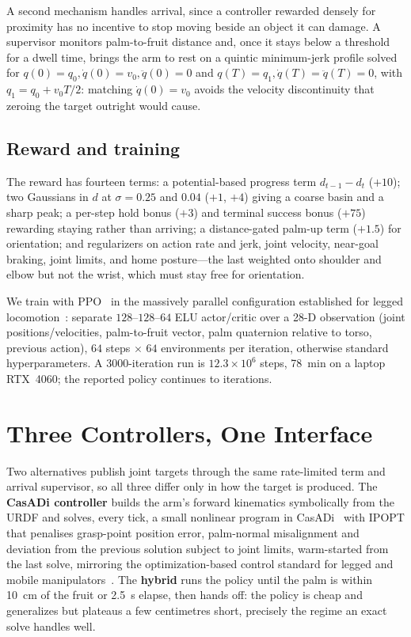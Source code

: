 \documentclass[conference]{IEEEtran}
\begin{document}
A second mechanism handles arrival, since a controller rewarded densely for
proximity has no incentive to stop moving beside an object it can damage. A
supervisor monitors palm-to-fruit distance and, once it stays below a
threshold for a dwell time, brings the arm to rest on a quintic minimum-jerk
profile solved for $q(0)=q_0,\dot q(0)=v_0,\ddot q(0)=0$ and
$q(T)=q_1,\dot q(T)=\ddot q(T)=0$, with $q_1=q_0+v_0T/2$: matching $\dot
q(0)=v_0$ avoids the velocity discontinuity that zeroing the target outright
would cause.

\subsection{Reward and training}
\label{sec:reward}

The reward has fourteen terms: a potential-based progress term $d_{t-1}-d_t$
($+10$); two Gaussians in $d$ at $\sigma=0.25$ and $0.04$ ($+1$, $+4$) giving a
coarse basin and a sharp peak; a per-step hold bonus ($+3$) and terminal
success bonus ($+75$) rewarding staying rather than arriving; a distance-gated
palm-up term ($+1.5$) for orientation; and regularizers on action rate and
jerk, joint velocity, near-goal braking, joint limits, and home posture---the
last weighted onto shoulder and elbow but not the wrist, which must stay free
for orientation.

We train with PPO~\cite{schulman2017ppo} in the massively parallel
configuration established for legged locomotion~\cite{rudin2022walk}: separate
$128$--$128$--$64$ ELU actor/critic over a 28-D observation (joint
positions/velocities, palm-to-fruit vector, palm quaternion relative to torso,
previous action), $64$ steps $\times$ $64$ environments per iteration,
otherwise standard hyperparameters. A $3000$-iteration run is $12.3\times10^6$
steps, \SI{78}{\minute} on a laptop RTX~4060; the reported policy continues to
\RESckpt{} iterations.

\section{Three Controllers, One Interface}
\label{sec:controllers}

Two alternatives publish joint targets through the same rate-limited term and
arrival supervisor, so all three differ only in how the target is produced.
The \textbf{CasADi controller} builds the arm's forward kinematics
symbolically from the URDF and solves, every tick, a small nonlinear program
in CasADi~\cite{andersson2019casadi} with IPOPT that penalises grasp-point
position error, palm-normal misalignment and deviation from the previous
solution subject to joint limits, warm-started from the last solve, mirroring
the optimization-based control standard for legged and mobile
manipulators~\cite{molnar2026wbid,rahman2026locoreview}. The \textbf{hybrid}
runs the policy until the palm is within \SI{10}{\centi\metre} of the fruit or
\SI{2.5}{\second} elapse, then hands off: the policy is cheap and generalizes
but plateaus a few centimetres short, precisely the regime an exact solve
handles well.
\end{document}

